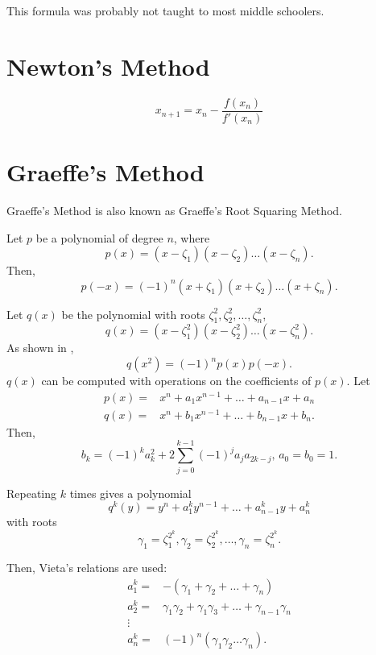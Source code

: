 \documentclass{article}
\begin{document}
This formula was probably not taught to most middle schoolers.




\section{Newton's Method}

\begin{equation}
	x_{n+1}=x_n-\frac{f(x_n)}{f'(x_n)}
\end{equation}

\section{Graeffe's Method}

Graeffe's Method is also known as Graeffe's Root Squaring Method.

Let $p$ be a polynomial of degree $n$, where 
\[p(x)=(x-\zeta_1)(x-\zeta_2)\dots(x-\zeta_n).\]
Then,
\[p(-x)=(-1)^n(x+\zeta_1)(x+\zeta_2)\dots(x+\zeta_n).\]

Let $q(x)$ be the polynomial with roots $\zeta_1^2,\zeta_2^2,\dots,\zeta_n^2$,
\[q(x)=(x-\zeta_1^2)(x-\zeta_2^2)\dots(x-\zeta_n^2).\]
As shown in \cite{wiki:graeffe}, 
\[q(x^2)=(-1)^np(x)p(-x).\]
$q(x)$ can be computed with operations on the coefficients of $p(x)$.
Let
\begin{align*}
	p(x) =& x^n+a_1x^{n-1}+\dots+a_{n-1}x+a_n \\
	q(x) =& x^n+b_1x^{n-1}+\dots+b_{n-1}x+b_n. 
\end{align*}
Then,
\[b_k=(-1)^ka_k^2+2\sum_{j=0}^{k-1}(-1)^ja_ja_{2k-j},\,a_0=b_0=1.\]

Repeating $k$ times gives a polynomial
\[q^k(y)=y^n+a_1^ky^{n-1}+\dots+a_{n-1}^ky+a_n^k\]
with roots
\[\gamma_1=\zeta_1^{2^k},\gamma_2=\zeta_2^{2^k},\dots,\gamma_n=\zeta_n^{2^k}.\]

Then, Vieta's relations\cite{wiki:vieta} are used: 
\begin{align*}
	a_1^k =& -(\gamma_1+\gamma_2+\dots+\gamma_n) \\
	a_2^k =& \gamma_1\gamma_2+\gamma_1\gamma_3+\dots+\gamma_{n-1}\gamma_n \\
	\vdots & \\
	a_n^k =& (-1)^n(\gamma_1\gamma_2\dots\gamma_n).
\end{align*}
\end{document}
